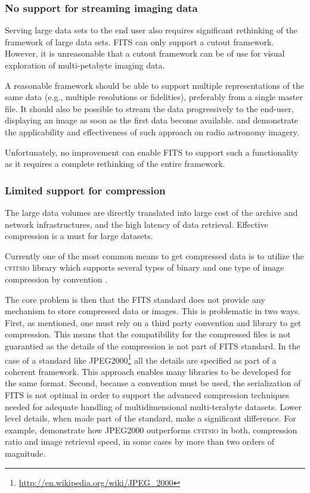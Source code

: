 \documentclass[final,authoryear,5p,times,twocolumn]{elsarticle}
\begin{document}
{{\subsubsection{No support for streaming imaging data}
\label{section_stream_image}

Serving large data sets to the end user also requires significant
rethinking of the framework of large data sets. FITS can only support a
cutout framework.  However, it is unreasonable that a cutout framework
can be of use for visual exploration of multi-petabyte imaging data.

A reasonable framework should be able to support multiple representations
of the same data (e.g., multiple resolutions or fidelities), preferably
from a single master file. It should also be possible to stream the data
progressively to the end-user, displaying an image as soon
as the first data become available. \citealt{2014Kitaeff} and 
\citealt{2014arXiv1401.7433P}  demonstrate the applicability and effectiveness 
of such approach on radio astronomy imagery. 

Unfortunately, no improvement can enable FITS to support
such a functionality as it requires a complete rethinking of the entire framework.

\subsubsection{Limited support for compression}

The large data volumes are directly translated into large cost of the archive and 
network infrastructures, and the high latency of data retrieval. Effective 
compression is a must for large datasets.

Currently one of the most common means to get compressed data is to utilize
the \textsc{cfitsio} library which supports several types of binary and one type of 
image compression by convention \citep[see
e.g.,][\href{http://ascl.net/1010.002}{ascl:1010.002}]{2000ASPC..216..551P, 
2007ASPC..376..483S,2009PASP..121..414P}.


The core problem is then that the FITS standard does not provide any mechanism 
to store compressed data or images.  This is problematic in two ways. First, 
as mentioned, one must rely on a third party convention and library to get compression.
This means that the compatibility for the 
compressed files is not guarantied as the details of the compression is not part of FITS
standard. In the case of a standard like JPEG2000\footnote{\href{http://en.wikipedia.org
/wiki/JPEG\_2000}{http://en.wikipedia.org/wiki/JPEG\_2000}}
all the details are specified as part of a coherent framework. This approach enables
many libraries to be developed for the same format.
Second, because a convention must be used, the serialization of FITS is not optimal 
in order to support the advanced 
compression techniques needed for adequate handling of multidimensional 
multi-terabyte datasets. Lower level details, when made part of the
standard, make a significant difference. For example, 
\citealt{2014Kitaeff} demonstrate 
how JPEG2000 outperforms \textsc{cfitsio} in both, compression ratio and 
image retrieval speed, in some cases by more than two orders of magnitude.


}}
\end{document}
